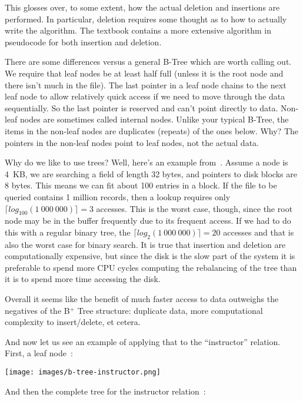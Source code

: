 This glosses over, to some extent, how the actual deletion and insertions are performed. In particular, deletion requires some thought as to how to actually write the algorithm. The textbook contains a more extensive algorithm in pseudocode for both insertion and deletion.

There are some differences versus a general B-Tree which are worth calling out. We require that leaf nodes be at least half full (unless it is the root node and there isn't much in the file). The last pointer in a leaf node chains to the next leaf node to allow relatively quick access if we need to move through the data sequentially. So the last pointer is reserved and can't point directly to data. Non-leaf nodes are sometimes called internal nodes. Unlike your typical B-Tree, the items in the non-leaf nodes are duplicates (repeats) of the ones below. Why? The pointers in the non-leaf nodes point to leaf nodes, not the actual data.

Why do we like to use trees? Well, here's an example from~\cite{dsc}. Assume a node is 4~KB, we are searching a field of length 32 bytes, and pointers to disk blocks are 8 bytes. This means we can fit about 100 entries in a block. If the file to be queried contains 1 million records, then a lookup requires only $\lceil log_{100}(1~000~000) \rceil = 3$ accesses. This is the worst case, though, since the root node may be in the buffer frequently due to its frequent access. If we had to do this with a regular binary tree, the $\lceil log_{2}(1~000~000) \rceil = 20$ accesses and that is also the worst case for binary search. It is true that insertion and deletion are computationally expensive, but since the disk is the slow part of the system it is preferable to spend more CPU cycles computing the rebalancing of the tree than it is to spend more time accessing the disk. 

Overall it seems like the benefit of much faster access to data outweighs the negatives of the B$^{+}$ Tree structure: duplicate data, more computational complexity to insert/delete, et cetera.

And now let us see an example of applying that to the ``instructor'' relation. First, a leaf node~\cite{dsc}:

\begin{center}
	\texttt{[image: images/b-tree-instructor.png]}
\end{center}

And then the complete tree for the instructor relation~\cite{dsc}:

